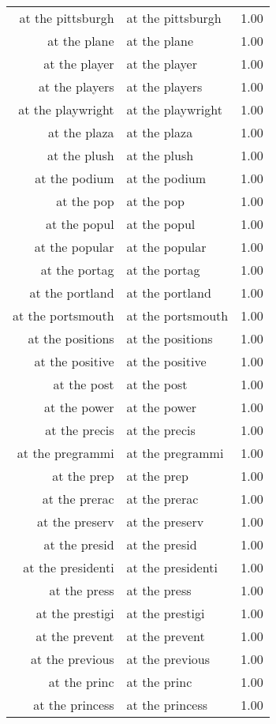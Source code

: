 \begin{table}[ht]
\begin{tabular}{rlr}
  at the pittsburgh & at the pittsburgh & 1.00 \\ 
  at the plane & at the plane & 1.00 \\ 
  at the player & at the player & 1.00 \\ 
  at the players & at the players & 1.00 \\ 
  at the playwright & at the playwright & 1.00 \\ 
  at the plaza & at the plaza & 1.00 \\ 
  at the plush & at the plush & 1.00 \\ 
  at the podium & at the podium & 1.00 \\ 
  at the pop & at the pop & 1.00 \\ 
  at the popul & at the popul & 1.00 \\ 
  at the popular & at the popular & 1.00 \\ 
  at the portag & at the portag & 1.00 \\ 
  at the portland & at the portland & 1.00 \\ 
  at the portsmouth & at the portsmouth & 1.00 \\ 
  at the positions & at the positions & 1.00 \\ 
  at the positive & at the positive & 1.00 \\ 
  at the post & at the post & 1.00 \\ 
  at the power & at the power & 1.00 \\ 
  at the precis & at the precis & 1.00 \\ 
  at the pregrammi & at the pregrammi & 1.00 \\ 
  at the prep & at the prep & 1.00 \\ 
  at the prerac & at the prerac & 1.00 \\ 
  at the preserv & at the preserv & 1.00 \\ 
  at the presid & at the presid & 1.00 \\ 
  at the presidenti & at the presidenti & 1.00 \\ 
  at the press & at the press & 1.00 \\ 
  at the prestigi & at the prestigi & 1.00 \\ 
  at the prevent & at the prevent & 1.00 \\ 
  at the previous & at the previous & 1.00 \\ 
  at the princ & at the princ & 1.00 \\ 
  at the princess & at the princess & 1.00 \\ 

\end{tabular}
\end{table}
